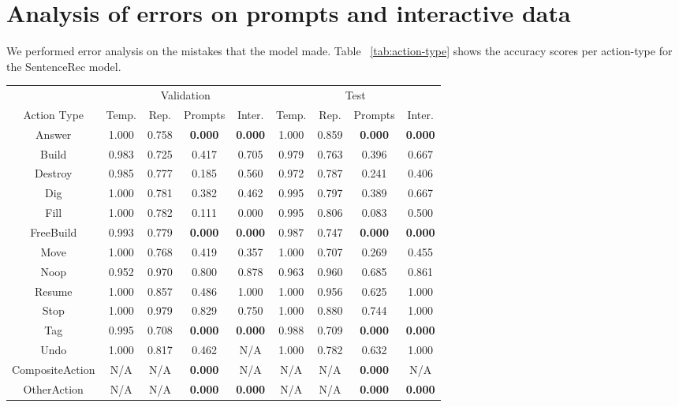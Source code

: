 \clearpage

\section{Analysis of errors on prompts and interactive data}
\label{sec:analysis_prompts}

We performed error analysis on the mistakes that the model made. Table ~\ref{tab:action-type} shows the accuracy scores per action-type for the SentenceRec model.
\begin{table*}
\small
\center
\begin{tabular}{c|cccc|cccc}
	& \multicolumn{4}{c|}{Validation} 	& \multicolumn{4}{c}{Test} \\
Action Type 	& Temp.	&	Rep.	&	Prompts	&	Inter.	&	Temp.	& Rep. 	&	Prompts 	&	Inter. \\
\midrule
Answer	&	1.000	&	0.758	& \textbf{0.000	}	&	\textbf{0.000}	&	1.000	&	0.859	&	\textbf{0.000}	&	\textbf{0.000} \\
\midrule
 Build	&	0.983	&	0.725	&	0.417	&	0.705	&	0.979	&	0.763	&	0.396	&	0.667 \\
 \midrule
 Destroy	&	0.985	&	0.777	&	0.185	&	0.560	&	0.972	&	0.787	&	0.241	&	0.406 \\
 \midrule
 Dig	&	1.000	&	0.781	&	0.382	&	0.462	&	0.995	&	0.797	&	0.389	&	0.667 \\
 \midrule
 Fill	&	1.000	&	0.782	&	0.111	&	0.000	&	0.995	&	0.806	&	0.083	&	0.500 \\
 \midrule
 FreeBuild	&	0.993	&	0.779	&	\textbf{0.000}	&	\textbf{0.000}	&	0.987	&	0.747	&	\textbf{0.000}	&	\textbf{0.000} \\
 \midrule
 Move	&	1.000	&	0.768	&	0.419	&	0.357	&	1.000	&	0.707	&	0.269	&	0.455 \\
 \midrule
 Noop	&	0.952	&	0.970	&	0.800	&	0.878	&	0.963	&	0.960	&	0.685	&	0.861 \\
 \midrule
 Resume	&	1.000	&	0.857	&	0.486	&	1.000	&	1.000	&	0.956	&	0.625	&	1.000 \\
 \midrule
 Stop		&	1.000	&	0.979	&	0.829	&	0.750	&	1.000	&	0.880	&	0.744	&	1.000 \\
 \midrule
 Tag	&	0.995	&	0.708	&	\textbf{0.000}	&	\textbf{0.000}	&	0.988	&	0.709	&	\textbf{0.000}	&	\textbf{0.000} \\
 \midrule
 Undo	&	1.000	&	0.817	&	0.462	&	N/A	&	1.000	&	0.782	&	0.632	&	1.000 \\
 \midrule
 CompositeAction	&	N/A	&	N/A	&	\textbf{0.000}	&	N/A	&	N/A	&	N/A	&	\textbf{0.000}	&	N/A \\
 \midrule
 OtherAction	&	N/A	&	N/A	&	\textbf{0.000}	&	\textbf{0.000}	&	N/A	&	N/A	&	\textbf{0.000}	&	\textbf{0.000} \\

\end{tabular}
\caption{Action type accuracy breakdown for the SentenceRec model over the validation and test datasets. 'N/A' refers to the action type not found in that dataset. }
\label{tab:action-type}
\end{table*}

